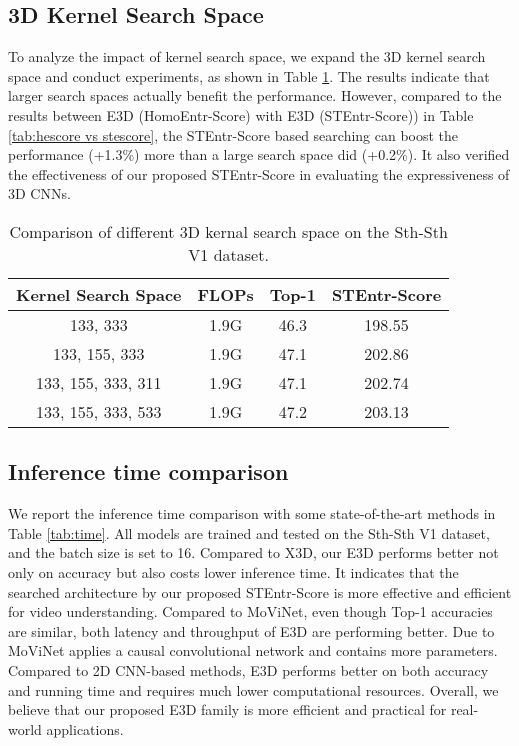 \documentclass{article} \usepackage{iclr2023_conference,times}
\begin{document}
\subsection{3D Kernel Search Space}
To analyze the impact of kernel search space, we expand the 3D kernel search space and conduct experiments, as shown in Table \ref{tab:search space}.
The results indicate that larger search spaces actually benefit the performance. However, compared to the results between E3D (HomoEntr-Score) with E3D (STEntr-Score)) in Table \ref{tab:hescore vs stescore}, the STEntr-Score based searching can boost the performance (+1.3\%) more than a large search space did (+0.2\%). 
It also verified the effectiveness of our proposed STEntr-Score in evaluating the expressiveness of 3D CNNs.

\begin{table}[h]
    \centering
\begin{tabular}{cccc}
    \toprule
       Kernel Search Space   & FLOPs & Top-1 & STEntr-Score\\
    \midrule
      133, 333  & 1.9G &  46.3 & 198.55\\
      133, 155, 333  & 1.9G &  47.1 & 202.86\\
      133, 155, 333, 311  & 1.9G &  47.1 & 202.74\\
      133, 155, 333, 533  & 1.9G &  47.2 & 203.13\\
\bottomrule
    \end{tabular}
    \caption{Comparison of different 3D kernal search space on the Sth-Sth V1 dataset.}
    \label{tab:search space}
\end{table}
\newpage
\subsection{Inference time comparison}
We report the inference time comparison with some state-of-the-art methods in Table \ref{tab:time}.
All models are trained and tested on the Sth-Sth V1 dataset, and the batch size is set to 16.
Compared to X3D, our E3D performs better not only on accuracy but also costs lower inference time. It indicates that the searched architecture by our proposed STEntr-Score is more effective and efficient for video understanding.
Compared to MoViNet, even though Top-1 accuracies are similar, both latency and throughput of E3D are performing better. Due to MoViNet applies a causal convolutional network and contains more parameters.
Compared to 2D CNN-based methods, E3D performs better on both accuracy and running time and requires much lower computational resources.
Overall, we believe that our proposed E3D family is more efficient and practical for real-world applications. 
 
\end{document}
